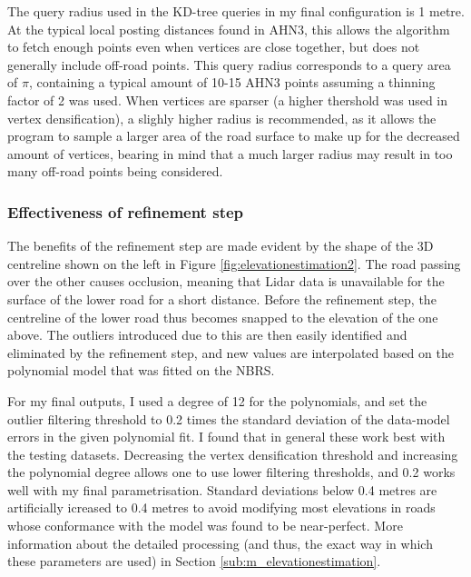 The query radius used in the KD-tree queries in my final configuration is 1 metre. At the typical local posting distances found in AHN3, this allows the algorithm to fetch enough points even when vertices are close together, but does not generally include off-road points. This query radius corresponds to a query area of $\pi$, containing a typical amount of 10-15 AHN3 points assuming a thinning factor of 2 was used. When vertices are sparser (a higher thershold was used in vertex densification), a slighly higher radius is recommended, as it allows the program to sample a larger area of the road surface to make up for the decreased amount of vertices, bearing in mind that a much larger radius may result in too many off-road points being considered.

\subsubsection{Effectiveness of refinement step}

The benefits of the refinement step are made evident by the shape of the 3D centreline shown on the left in Figure \ref{fig:elevationestimation2}. The road passing over the other causes occlusion, meaning that Lidar data is unavailable for the surface of the lower road for a short distance. Before the refinement step, the centreline of the lower road thus becomes snapped to the elevation of the one above. The outliers introduced due to this are then easily identified and eliminated by the refinement step, and new values are interpolated based on the polynomial model that was fitted on the NBRS.

For my final outputs, I used a degree of 12 for the polynomials, and set the outlier filtering threshold to 0.2 times the standard deviation of the data-model errors in the given polynomial fit. I found that in general these work best with the testing datasets. Decreasing the vertex densification threshold and increasing the polynomial degree allows one to use lower filtering thresholds, and 0.2 works well with my final parametrisation. Standard deviations below 0.4 metres are artificially icreased to 0.4 metres to avoid modifying most elevations in roads whose conformance with the model was found to be near-perfect. More information about the detailed processing (and thus, the exact way in which these parameters are used) in Section \ref{sub:m_elevationestimation}.

